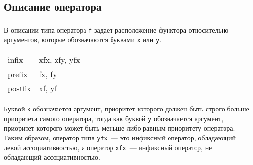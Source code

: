 \subsection{Описание оператора}



\begin{frame}

	\frametitle{\insertsection}
	\framesubtitle{\insertsubsection}
	
	В описании типа оператора \texttt{f} задает расположение функтора относительно аргументов, которые обозначаются буквами \texttt{x} или \texttt{y}.
	
	\begin{table}
		\centering
		\begin{tabular}{ l l }
			\rowcolor{LightGray} infix & xfx, xfy, yfx \\
			\rowcolor{LightGray} prefix & fx, fy \\
			\rowcolor{LightGray} postfix & xf, yf \\
		\end{tabular}
	\end{table}

	Буквой \texttt{x} обозначается аргумент, приоритет которого должен быть строго больше приоритета самого оператора, тогда как буквой \texttt{y} обозначается аргумент, приоритет которого может быть меньше либо равным приоритету оператора. Таким образом, оператор типа \texttt{yfx}~--- это инфиксный оператор, обладающий левой ассоциативностью, а оператор \texttt{xfx}~--- инфиксный оператор, не обладающий ассоциативностью.

\end{frame}


